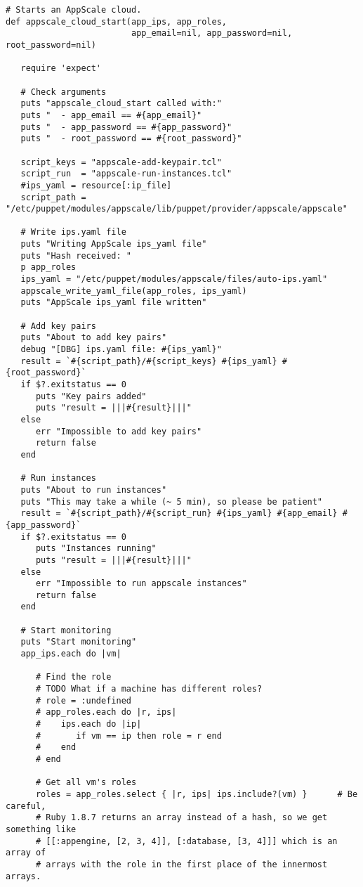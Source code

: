 \begin{lstlisting}
# Starts an AppScale cloud.
def appscale_cloud_start(app_ips, app_roles,
                         app_email=nil, app_password=nil, root_password=nil)

   require 'expect'
   
   # Check arguments
   puts "appscale_cloud_start called with:"
   puts "  - app_email == #{app_email}"
   puts "  - app_password == #{app_password}"
   puts "  - root_password == #{root_password}"
   
   script_keys = "appscale-add-keypair.tcl"
   script_run  = "appscale-run-instances.tcl"
   #ips_yaml = resource[:ip_file]
   script_path = "/etc/puppet/modules/appscale/lib/puppet/provider/appscale/appscale"

   # Write ips.yaml file
   puts "Writing AppScale ips_yaml file"
   puts "Hash received: "
   p app_roles
   ips_yaml = "/etc/puppet/modules/appscale/files/auto-ips.yaml"
   appscale_write_yaml_file(app_roles, ips_yaml)
   puts "AppScale ips_yaml file written"

   # Add key pairs
   puts "About to add key pairs"
   debug "[DBG] ips.yaml file: #{ips_yaml}"
   result = `#{script_path}/#{script_keys} #{ips_yaml} #{root_password}`
   if $?.exitstatus == 0
      puts "Key pairs added"
      puts "result = |||#{result}|||"
   else
      err "Impossible to add key pairs"
      return false
   end
   
   # Run instances
   puts "About to run instances"
   puts "This may take a while (~ 5 min), so please be patient"
   result = `#{script_path}/#{script_run} #{ips_yaml} #{app_email} #{app_password}`
   if $?.exitstatus == 0
      puts "Instances running"
      puts "result = |||#{result}|||"
   else
      err "Impossible to run appscale instances"
      return false
   end
   
   # Start monitoring
   puts "Start monitoring"
   app_ips.each do |vm|
   
      # Find the role
      # TODO What if a machine has different roles?
      # role = :undefined
      # app_roles.each do |r, ips|
      #    ips.each do |ip|
      #       if vm == ip then role = r end
      #    end
      # end

      # Get all vm's roles
      roles = app_roles.select { |r, ips| ips.include?(vm) }      # Be careful,
      # Ruby 1.8.7 returns an array instead of a hash, so we get something like
      # [[:appengine, [2, 3, 4]], [:database, [3, 4]]] which is an array of
      # arrays with the role in the first place of the innermost arrays.
      

\end{lstlisting}
